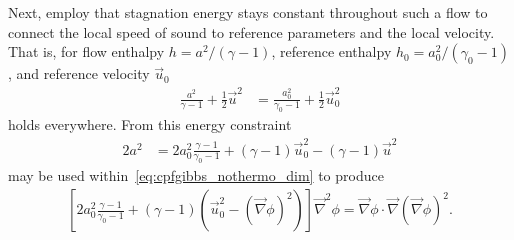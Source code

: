 \documentclass[letterpaper,11pt,nointlimits,reqno]{amsart}
\begin{document}
Next, \citeauthor{Saad2011Coordinate} employ that stagnation energy stays
constant throughout such a flow to connect the local speed of sound to
reference parameters and the local velocity.  That is, for flow enthalpy $h =
a^2 / \left(\gamma-1\right)$, reference enthalpy $h_0 = a_0^2 /
\left(\gamma_0-1\right)$, and reference velocity $\vec{u}_0$
\begin{align}
        \frac{a^2  }{\gamma  -1} + \frac{1}{2} \vec{u}^2
     &= \frac{a_0^2}{\gamma_0-1} + \frac{1}{2} \vec{u}_0^2
\end{align}
holds everywhere. From this energy constraint
\begin{align}
        2a^2
     &=   2a_0^2 \frac{\gamma-1}{\gamma_0-1}
        + \left(\gamma-1\right)\vec{u}_0^2
        - \left(\gamma-1\right)\vec{u}^2
\label{eq:stagnation_sound}
\end{align}
may be used within~\eqref{eq:cpfgibbs_nothermo_dim} to produce
\begin{align}
    \left[
          2a_0^2 \frac{\gamma-1}{\gamma_0-1}
        + \left(\gamma-1\right)
          \left(\vec{u}_0^2 - \left(\vec{\nabla}\phi\right)^2\right)
    \right] \vec{\nabla}^2\phi
     = \vec{\nabla}\phi\cdot \vec{\nabla}\left(\vec{\nabla}\phi\right)^2
\label{eq:cpfgibbs_dim}
.
\end{align}
\end{document}

